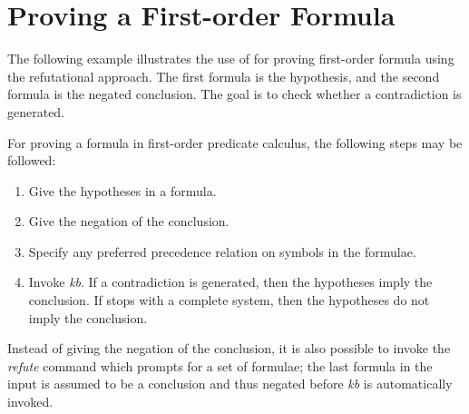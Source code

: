 \normalsize
\rm
\vspace{0.5in}
\section{Proving a First-order Formula}
\normalsize
\rm
The following example illustrates the use of \RRL for proving
first-order formula using the refutational approach. The first formula
is the hypothesis, and the second formula is the negated conclusion.
The goal is to check whether a contradiction is generated.

For proving a formula in first-order predicate calculus,
the following steps may be followed:
\begin{enumerate}
\item Give the hypotheses in a formula.
\item Give the negation of the conclusion.
\item Specify any preferred precedence relation on symbols in the formulae.
\item Invoke {\em kb}. If a contradiction is generated, then the hypotheses imply the conclusion. If \RRL stops with a complete system,
then the hypotheses do not imply the conclusion.
\end{enumerate}
Instead of giving the negation of the conclusion, it is also possible
to invoke the {\em refute} command which prompts
for a set of formulae; the last formula in the input is assumed to be
a conclusion and thus negated before {\em kb} is automatically invoked.


